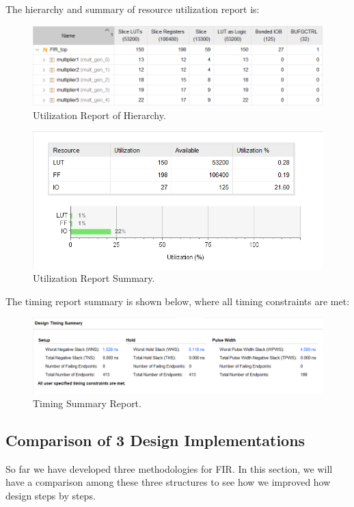 \documentclass[a4paper]{article}
\begin{document}
The hierarchy and summary of resource utilization report is:
\begin{figure}[H]
    \centering
    \includegraphics[width=1\textwidth]{part4_3_4_2_1.png}
    \caption{Utilization Report of Hierarchy.}
\end{figure}
\begin{figure}[H]
    \centering
    \includegraphics[width=1\textwidth]{part4_3_4_2_2.png}
    \caption{Utilization Report Summary.}
\end{figure}

The timing report summary is shown below, where all timing constraints are met:
\begin{figure}[H]
    \centering
    \includegraphics[width=1\textwidth]{part4_3_4_3.png}
    \caption{Timing Summary Report.}
\end{figure}

\subsection{Comparison of 3 Design Implementations}
So far we have developed three methodologies for FIR. In this section, we will have a comparison among these three structures to see how we improved how design steps by steps.
\end{document}
